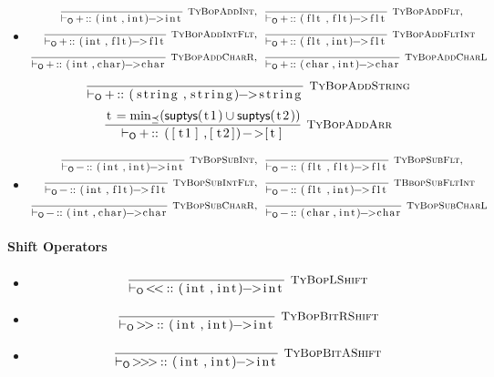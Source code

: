 \documentclass{article}
\newcommand{\code}[1]{\lstinline[columns=fixed]{#1}}
\newcommand{\drmrule}[5]{\frac{#1}{#2\vdash_{\mathsf{#3}}#4}\textsc{\ \small{#5}}}
\newcommand{\mc}[1]{\textnormal{\code{#1}}}
\newcommand{\subsubsubsection}{\paragraph}
\begin{document}
					\begin{itemize}
						\item
							\begin{align*}
								\drmrule{}{}{O}{\mc{+} :: \mc{(int,int)->int}}{TyBopAddInt},\ \ &
								\drmrule{}{}{O}{\mc{+} :: \mc{(flt,flt)->flt}}{TyBopAddFlt},\\
								\drmrule{}{}{O}{\mc{+} :: \mc{(int,flt)->flt}}{TyBopAddIntFlt},\ \ & 
								\drmrule{}{}{O}{\mc{+} :: \mc{(flt,int)->flt}}{TyBopAddFltInt}\\
								\drmrule{}{}{O}{\mc{+} :: \mc{(int,char)->char}}{TyBopAddCharR},\ \ &
								\drmrule{}{}{O}{\mc{+} :: \mc{(char,int)->char}}{TyBopAddCharL}
							\end{align*}\begin{align*}
								\drmrule{}{}{O}{\mc{+} :: \mc{(string,string)->string}}{TyBopAddString}
							\end{align*}\begin{align*}
								\drmrule{\mc{t}=\min_\preceq(\mathsf{suptys}(\mc{t1})\cup\mathsf{suptys}(\mc{t2}))}{}{O}{\mc{+} :: \mc{([t1],[t2])->[t]}}{TyBopAddArr}
							\end{align*}
						\item
							\begin{align*}
								\drmrule{}{}{O}{\mc{-} :: \mc{(int,int)->int}}{TyBopSubInt},\ \ &
								\drmrule{}{}{O}{\mc{-} :: \mc{(flt,flt)->flt}}{TyBopSubFlt},\\
								\drmrule{}{}{O}{\mc{-} :: \mc{(int,flt)->flt}}{TyBopSubIntFlt},\ \ & 
								\drmrule{}{}{O}{\mc{-} :: \mc{(flt,int)->flt}}{TBbopSubFltInt}\\
								\drmrule{}{}{O}{\mc{-} :: \mc{(int,char)->char}}{TyBopSubCharR},\ \ &
								\drmrule{}{}{O}{\mc{-} :: \mc{(char,int)->char}}{TyBopSubCharL}
							\end{align*}
					\end{itemize}
				
				\subsubsubsection{Shift Operators}
				
					\begin{itemize}
						\item
							\begin{align*}
								\drmrule{}{}{O}{\mc{<<} :: \mc{(int,int)->int}}{TyBopLShift}
							\end{align*}
						\item
							\begin{align*}
								\drmrule{}{}{O}{\mc{>>} :: \mc{(int,int)->int}}{TyBopBitRShift}
							\end{align*}
						\item
							\begin{align*}
								\drmrule{}{}{O}{\mc{>>>} :: \mc{(int,int)->int}}{TyBopBitAShift}
							\end{align*}
					\end{itemize}
				
\end{document}
